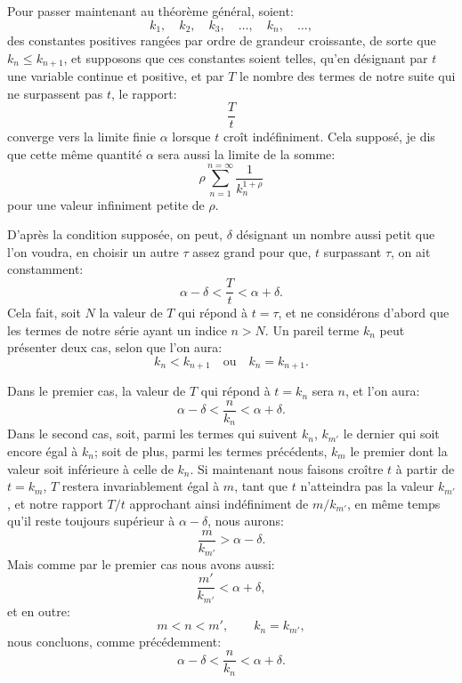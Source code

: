 \documentclass[11pt]{article}
\begin{document}
Pour passer maintenant au théorème général, soient:
\[
k_1,\quad k_2,\quad k_3,\quad \ldots,\quad k_n,\quad \ldots,
\]
des constantes positives rangées par ordre de grandeur croissante, de sorte que \(k_n\leq k_{n+1}\), et supposons que ces constantes soient telles, qu'en désignant par \(t\) une variable continue et positive, et par \(T\) le nombre des termes de notre suite qui ne surpassent pas \(t\), le rapport:
\[
\frac{T}{t}
\]
converge vers la limite finie \(\alpha\) lorsque \(t\) croît indéfiniment. Cela supposé, je dis que cette même quantité \(\alpha\) sera aussi la limite de la somme:
\[
\tag{1} \rho\sum_{n=1}^{n=\infty}\frac{1}{k_n^{1+\rho}}
\]
pour une valeur infiniment petite de \(\rho\).

D'après la condition supposée, on peut, \(\delta\) désignant un nombre aussi petit que l'on voudra, en choisir un autre \(\tau\) assez grand pour que, \(t\) surpassant \(\tau\), on ait constamment:
\[
\alpha-\delta<\frac{T}{t}<\alpha+\delta.
\]
Cela fait, soit \(N\) la valeur de \(T\) qui répond à \(t=\tau\), et ne considérons d'abord que les termes de notre série ayant un indice \(n>N\). Un pareil terme \(k_n\) peut présenter deux cas, selon que l'on aura:
\[
k_n<k_{n+1}\quad\text{ou}\quad k_n=k_{n+1}.
\]

Dans le premier cas, la valeur de \(T\) qui répond à \(t=k_n\) sera \(n\), et l'on aura:
\[
\alpha-\delta<\frac{n}{k_n}<\alpha+\delta.
\]
Dans le second cas, soit, parmi les termes qui suivent \(k_n\), \(k_{m'}\) le dernier qui soit encore égal à \(k_n\); soit de plus, parmi les termes précédents, \(k_m\) le premier dont la valeur soit inférieure à celle de \(k_n\). Si maintenant nous faisons croître \(t\) à partir de \(t=k_m\), \(T\) restera invariablement égal à \(m\), tant que \(t\) n'atteindra pas la valeur \(k_{m'}\), et notre rapport \(T/t\) approchant ainsi indéfiniment de \(m/k_{m'}\), en même temps qu'il reste toujours supérieur à \(\alpha-\delta\), nous aurons:
\[
\frac{m}{k_{m'}}>\alpha-\delta.
\]
Mais comme par le premier cas nous avons aussi:
\[
\frac{m'}{k_{m'}}<\alpha+\delta,
\]
et en outre:
\[
m<n<m',\qquad k_n=k_{m'},
\]
nous concluons, comme précédemment:
\[
\alpha-\delta<\frac{n}{k_n}<\alpha+\delta.
\]
\end{document}
